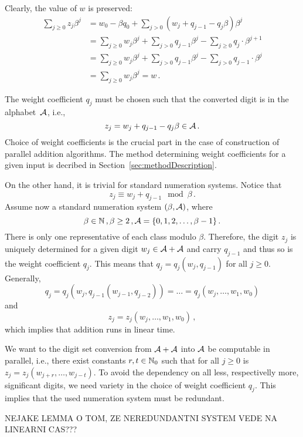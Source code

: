      Clearly, the value of $w$ is preserved:
\begin{align*}
    \sum_{j\geq 0} z_j \beta^j &=w_0 - \beta q_0 + \sum_{j> 0} (w_j + q_{j-1} - q_j \beta) \beta^j \\
    &=\sum_{j\geq 0} w_j \beta^j + \sum_{j>0} q_{j-1} \beta^j - \sum_{j\geq 0} q_j \cdot \beta^{j+1} \\
    &=\sum_{j\geq 0} w_j \beta^j + \sum_{j>0} q_{j-1} \beta^j - \sum_{j> 0} q_{j-1} \cdot \beta^j \\
    &=\sum_{j\geq 0} w_j \beta^j = w\,.
\end{align*}

     The weight coefficient $q_j$ must be chosen such that the converted digit is in the alphabet~$\mathcal{A}$, i.e., 
    \begin{equation}
    \label{eq:conversionFormula}
        z_j=w_j + q_{j-1} - q_j \beta \in \mathcal{A}\,.
    \end{equation}
    Choice of weight coefficients is the crucial part in the case of construction of parallel addition algorithms. The method determining weight coefficients for a given input is decribed in Section~\ref{sec:methodDescription}.
    
     On the other hand, it is trivial for standard numeration systems.  Notice that
    $$
        z_j \equiv w_j+q_{j-1} \mod \beta\,. 
    $$
  Assume now a standard numeration system $(\beta, \mathcal{A})$, where
  $$
    \beta \in \mathbb{N}\,,\beta  \geq 2\,, \mathcal{A} = \{0, 1, 2,\dots, \beta -1 \}\,.
  $$ 
  There is only one representative of each class modulo  $\beta$. Therefore, the digit $z_j$ is uniquely determined for a given digit $w_j \in \mathcal{A}+\mathcal{A}$ and carry $q_{j-1}$ and thus so is the weight coefficient $q_j$. This means that $q_j=q_j(w_j,q_{j-1})$ for all $j\geq 0$. Generally,
  $$
  q_j=q_j(w_j,q_{j-1}(w_{j-1},q_{j-2}))=\dots =q_j(w_j ,\dots , w_1, w_0)
  $$
  and
  $$
  z_j=z_j(w_j ,\dots , w_1, w_0)\,,
  $$
  which implies that addition runs in linear time.
  
  We want to the digit set conversion from $\mathcal{A}+\mathcal{A}$ into $\mathcal{A}$ be computable in parallel, i.e., there exist constants $r,t \in \mathbb{N}_0$ such that for all $j\geq 0$ is $z_j=z_j(w_{j+r},\dots,w_{j-t})$. To avoid the dependency on all less, respectivelly more, significant digits, we need variety in the choice of weight coefficient $q_j$. This implies that the used numeration system must be redundant.
  
  
  
  NEJAKE LEMMA O TOM, ZE NEREDUNDANTNI SYSTEM VEDE NA LINEARNI CAS???


